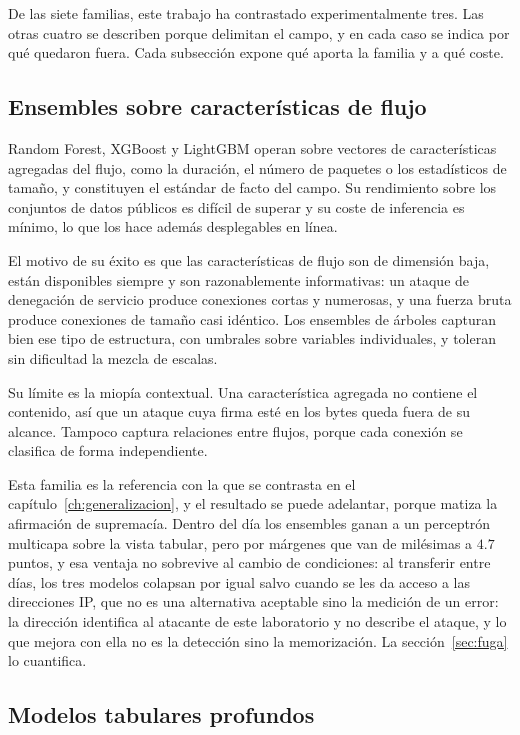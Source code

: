 De las siete familias, este trabajo ha contrastado experimentalmente tres. Las
otras cuatro se describen porque delimitan el campo, y en cada caso se indica por
qué quedaron fuera. Cada subsección expone qué aporta la familia y a qué coste.

\subsection{Ensembles sobre características de flujo}

Random Forest, XGBoost \cite{Chen2016} y LightGBM operan sobre vectores de
características agregadas del flujo, como la duración, el número de paquetes o
los estadísticos de tamaño, y constituyen el estándar de facto del campo. Su
rendimiento sobre los conjuntos de datos públicos es difícil de superar y su
coste de inferencia es mínimo, lo que los hace además desplegables en línea.

El motivo de su éxito es que las características de flujo son de dimensión baja,
están disponibles siempre y son razonablemente informativas: un ataque de
denegación de servicio produce conexiones cortas y numerosas, y una fuerza bruta
produce conexiones de tamaño casi idéntico. Los ensembles de árboles capturan
bien ese tipo de estructura, con umbrales sobre variables individuales, y toleran
sin dificultad la mezcla de escalas.

Su límite es la miopía contextual. Una característica agregada no contiene el
contenido, así que un ataque cuya firma esté en los bytes queda fuera de su
alcance. Tampoco captura relaciones entre flujos, porque cada conexión se
clasifica de forma independiente.

Esta familia es la referencia con la que se contrasta en el
capítulo~\ref{ch:generalizacion}, y el resultado se puede adelantar, porque
matiza la afirmación de supremacía. Dentro del día los ensembles ganan a un
perceptrón multicapa sobre la vista tabular, pero por márgenes que van de
milésimas a $4.7$ puntos, y esa ventaja no sobrevive al cambio de condiciones:
al transferir entre días, los tres modelos colapsan por igual salvo cuando se les
da acceso a las direcciones IP, que no es una alternativa aceptable sino la
medición de un error: la dirección identifica al atacante de este laboratorio y
no describe el ataque, y lo que mejora con ella no es la detección sino
la memorización. La sección~\ref{sec:fuga} lo cuantifica.

\subsection{Modelos tabulares profundos}

